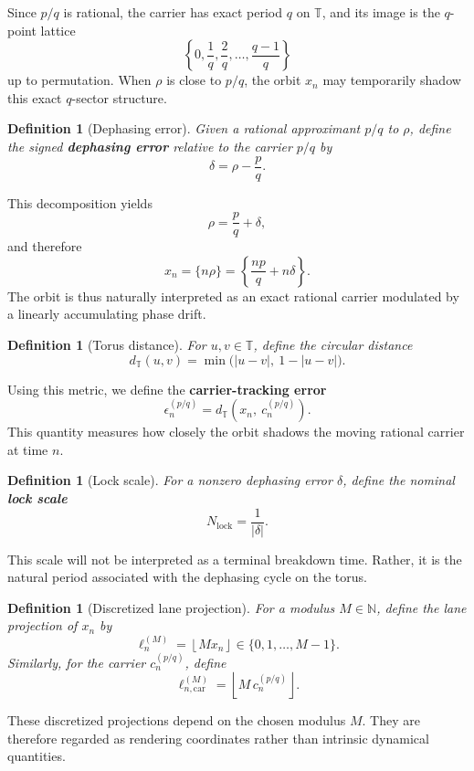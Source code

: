 \documentclass[11pt]{article}
\newtheorem{definition}[theorem]{Definition}
\newcommand{\T}{\mathbb{T}}
\begin{document}
Since $p/q$ is rational, the carrier has exact period $q$ on $\T$, and its image is the $q$-point lattice
\[
\left\{0,\frac{1}{q},\frac{2}{q},\dots,\frac{q-1}{q}\right\}
\]
up to permutation. When $\rho$ is close to $p/q$, the orbit $x_n$ may temporarily shadow this exact $q$-sector structure.

\begin{definition}[Dephasing error]
Given a rational approximant $p/q$ to $\rho$, define the signed \textbf{dephasing error} relative to the carrier $p/q$ by
\[
\delta=\rho-\frac{p}{q}.
\]
\end{definition}

This decomposition yields
\[
\rho=\frac{p}{q}+\delta,
\]
and therefore
\[
x_n
=
\{n\rho\}
=
\left\{\frac{np}{q}+n\delta\right\}.
\]
The orbit is thus naturally interpreted as an exact rational carrier modulated by a linearly accumulating phase drift.

\begin{definition}[Torus distance]
For $u,v\in \T$, define the circular distance
\[
d_{\T}(u,v)=\min\bigl(|u-v|,\ 1-|u-v|\bigr).
\]
\end{definition}

Using this metric, we define the \textbf{carrier-tracking error}
\begin{equation}
\epsilon_n^{(p/q)}
=
d_{\T}\!\left(x_n,\ c_n^{(p/q)}\right).
\end{equation}
This quantity measures how closely the orbit shadows the moving rational carrier at time $n$.

\begin{definition}[Lock scale]
For a nonzero dephasing error $\delta$, define the nominal \textbf{lock scale}
\[
N_{\mathrm{lock}}=\frac{1}{|\delta|}.
\]
\end{definition}

This scale will not be interpreted as a terminal breakdown time. Rather, it is the natural period associated with the dephasing cycle on the torus.

\begin{definition}[Discretized lane projection]
For a modulus $M\in\mathbb{N}$, define the lane projection of $x_n$ by
\[
\ell_n^{(M)}=\left\lfloor Mx_n\right\rfloor \in \{0,1,\dots,M-1\}.
\]
Similarly, for the carrier $c_n^{(p/q)}$, define
\[
\ell_{n,\mathrm{car}}^{(M)}=
\left\lfloor M\,c_n^{(p/q)}\right\rfloor.
\]
\end{definition}

These discretized projections depend on the chosen modulus $M$. They are therefore regarded as rendering coordinates rather than intrinsic dynamical quantities.
\end{document}
